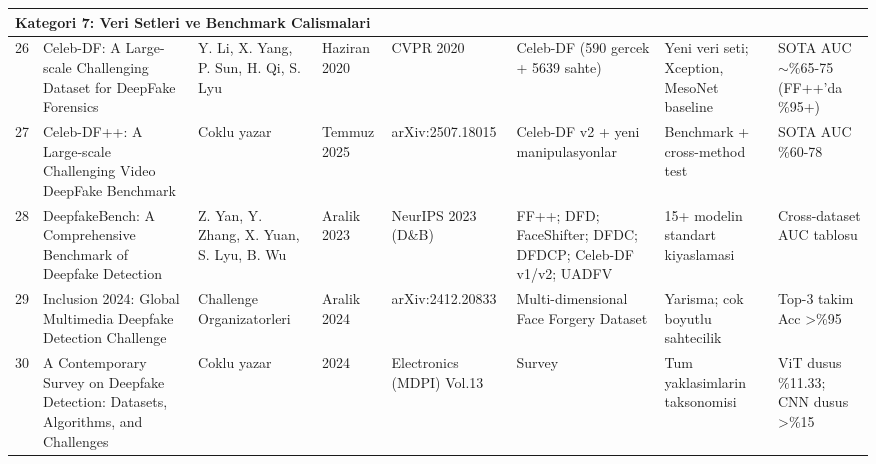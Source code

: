 \begin{landscape}
\begin{longtable}{@{}p{0.5cm} p{4.2cm} p{3.0cm} p{1.6cm} p{3.0cm} p{3.0cm} p{4.2cm} p{3.5cm}@{}}
\multicolumn{8}{l}{\textbf{Kategori 7: Veri Setleri ve Benchmark Calismalari}} \\
\midrule
26 & Celeb-DF: A Large-scale Challenging Dataset for DeepFake Forensics & Y. Li, X. Yang, P. Sun, H. Qi, S. Lyu & Haziran 2020 & CVPR 2020 & Celeb-DF (590 gercek + 5639 sahte) & Yeni veri seti; Xception, MesoNet baseline & SOTA AUC $\sim$\%65-75 (FF++'da \%95+) \\
\midrule
27 & Celeb-DF++: A Large-scale Challenging Video DeepFake Benchmark & Coklu yazar & Temmuz 2025 & arXiv:2507.18015 & Celeb-DF v2 + yeni manipulasyonlar & Benchmark + cross-method test & SOTA AUC \%60-78 \\
\midrule
28 & DeepfakeBench: A Comprehensive Benchmark of Deepfake Detection & Z. Yan, Y. Zhang, X. Yuan, S. Lyu, B. Wu & Aralik 2023 & NeurIPS 2023 (D\&B) & FF++; DFD; FaceShifter; DFDC; DFDCP; Celeb-DF v1/v2; UADFV & 15+ modelin standart kiyaslamasi & Cross-dataset AUC tablosu \\
\midrule
29 & Inclusion 2024: Global Multimedia Deepfake Detection Challenge & Challenge Organizatorleri & Aralik 2024 & arXiv:2412.20833 & Multi-dimensional Face Forgery Dataset & Yarisma; cok boyutlu sahtecilik & Top-3 takim Acc \textgreater \%95 \\
\midrule
30 & A Contemporary Survey on Deepfake Detection: Datasets, Algorithms, and Challenges & Coklu yazar & 2024 & Electronics (MDPI) Vol.13 & Survey & Tum yaklasimlarin taksonomisi & ViT dusus \%11.33; CNN dusus \textgreater \%15 \\

\end{longtable}

\end{landscape}


